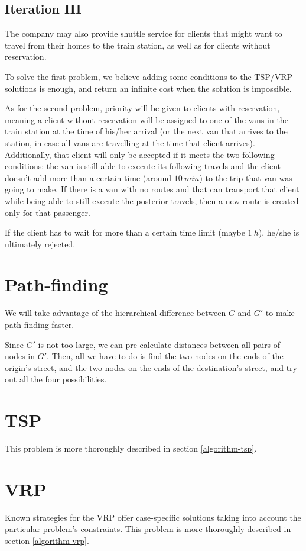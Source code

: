 \subsection{Iteration III}
The company may also provide shuttle service for clients that might want to travel from their homes to the train station, as well as for clients without reservation.\par
To solve the first problem, we believe adding some conditions to the TSP/VRP solutions is enough, and return an infinite cost when the solution is impossible.\par
As for the second problem, priority will be given to clients with reservation, meaning a client without reservation will be assigned to one of the vans in the train station at the time of his/her arrival (or the next van that arrives to the station, in case all vans are travelling at the time that client arrives). Additionally, that client will only be accepted if it meets the two following conditions: the van is still able to execute its following travels and the client doesn't add more than a certain time (around $\SI{10}{min}$) to the trip that van was going to make. If there is a van with no routes and that can transport that client while being able to still execute the posterior travels, then a new route is created only for that passenger.\par
If the client has to wait for more than a certain time limit (maybe $\SI{1}{h}$), he/she is ultimately rejected.
\section{Path-finding} \label{problem-decomposition-pathfinding}
We will take advantage of the hierarchical difference between $G$ and $G'$ to make path-finding faster.\par
Since $G'$ is not too large, we can pre-calculate distances between all pairs of nodes in $G'$.
Then, all we have to do is find the two nodes on the ends of the origin's street, and the two nodes on the ends of the destination's street, and try out all the four possibilities.
\section{\texorpdfstring{\Acrlong*{TSP}}{Travelling salesman problem}} \label{problem-decomposition-tsp}
This problem is more thoroughly described in section \ref{algorithm-tsp}.
\section{\texorpdfstring{\Acrlong*{VRP}}{Vehicle routing problem}} \label{problem-decomposition-vrp}
Known strategies for the \acrshort{VRP} offer case-specific solutions taking into account the particular problem's constraints. This problem is more thoroughly described in section \ref{algorithm-vrp}.
